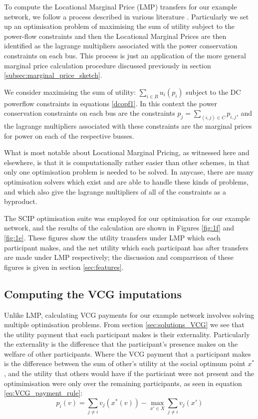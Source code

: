 To compute the Locational Marginal Price (LMP) transfers for our example network, we follow a process described in various literature \cite{lmp1,lmp2}.
Particularly we set up an optimisation problem of maximising the sum of utility subject to the power-flow constraints and then the Locational Marginal Prices are then identified as the lagrange multipliers associated with the power conservation constraints on each bus.
This process is just an application of the more general marginal price calculation procedure discussed previously in section \ref{subsec:marginal_price_sketch}.

We consider maximising the sum of utility: $\sum_{i\in B} u_i(p_i)$ subject to the DC powerflow constraints in equations \ref{dcopf1}.
In this context the power conservation constraints on each bus are the constraints $p_j = \sum_{(i,j)\in C}p_{i,j}$, and the lagrange multipliers associated with these constraints are the marginal prices for power on each of the respective busses.

What is most notable about Locational Marginal Pricing, as witnessed here and elsewhere, is that it is computationally rather easier than other schemes, in that only one optimisation problem is needed to be solved.
In anycase, there are many optimisation solvers which exist and are able to handle these kinds of problems, and which also give the lagrange multipliers of all of the constraints as a byproduct.

The SCIP optimisation suite \cite{MaherFischerGallyetal.2017} was employed for our optimisation for our example network, and the results of the calculation are shown in Figures \ref{fig:1f} and \ref{fig:1e}.
These figures show the utility transfers under LMP which each participant makes, and the net utility which each participant has after transfers are made under LMP respectively; the discussion and comparrison of these figures is given in section \ref{sec:features}.

\subsection{Computing the VCG imputations}\label{subsec:VCG_compute1}

Unlike LMP, calculating VCG payments for our example network involves solving multiple optimisation problems.
From section \ref{sec:solutions_VCG} we see that the utility payment that each participant makes is their externality.
Particularly the externality is the difference that the participant's presence makes on the welfare of other participants.
Where the VCG payment that a participant makes is the difference between the sum of other's utility at the social optimum point $x^*$, and the utility that others would have if the particiant were not present and the optimimisation were only over the remaining participants, as seen in equation \ref{eq:VCG_payment_rule}:
\begin{equation*} p_i(v)=\sum_{j\ne i}v_j(x^*(v)) - \max_{x'\in X}\sum_{j\ne i}v_j(x') \end{equation*}

